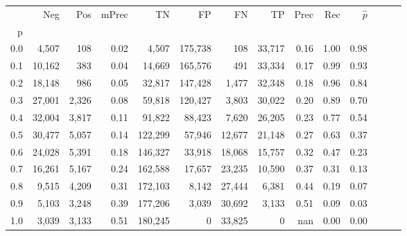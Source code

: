 \begin{tabular}{rrrrrrrrrrrrrr}
\toprule
{} &     Neg &    Pos & mPrec &       TN &       FP &      FN &      TP &  Prec &   Rec & $\hat{p}$ \\
p   &         &        &       &          &          &         &         &       &       &           \\
\midrule
0.0 &   4,507 &    108 &  0.02 &    4,507 &  175,738 &     108 &  33,717 &  0.16 &  1.00 &      0.98 \\
0.1 &  10,162 &    383 &  0.04 &   14,669 &  165,576 &     491 &  33,334 &  0.17 &  0.99 &      0.93 \\
0.2 &  18,148 &    986 &  0.05 &   32,817 &  147,428 &   1,477 &  32,348 &  0.18 &  0.96 &      0.84 \\
0.3 &  27,001 &  2,326 &  0.08 &   59,818 &  120,427 &   3,803 &  30,022 &  0.20 &  0.89 &      0.70 \\
0.4 &  32,004 &  3,817 &  0.11 &   91,822 &   88,423 &   7,620 &  26,205 &  0.23 &  0.77 &      0.54 \\
0.5 &  30,477 &  5,057 &  0.14 &  122,299 &   57,946 &  12,677 &  21,148 &  0.27 &  0.63 &      0.37 \\
0.6 &  24,028 &  5,391 &  0.18 &  146,327 &   33,918 &  18,068 &  15,757 &  0.32 &  0.47 &      0.23 \\
0.7 &  16,261 &  5,167 &  0.24 &  162,588 &   17,657 &  23,235 &  10,590 &  0.37 &  0.31 &      0.13 \\
0.8 &   9,515 &  4,209 &  0.31 &  172,103 &    8,142 &  27,444 &   6,381 &  0.44 &  0.19 &      0.07 \\
0.9 &   5,103 &  3,248 &  0.39 &  177,206 &    3,039 &  30,692 &   3,133 &  0.51 &  0.09 &      0.03 \\
1.0 &   3,039 &  3,133 &  0.51 &  180,245 &        0 &  33,825 &       0 &   nan &  0.00 &      0.00 \\
\bottomrule
\end{tabular}
